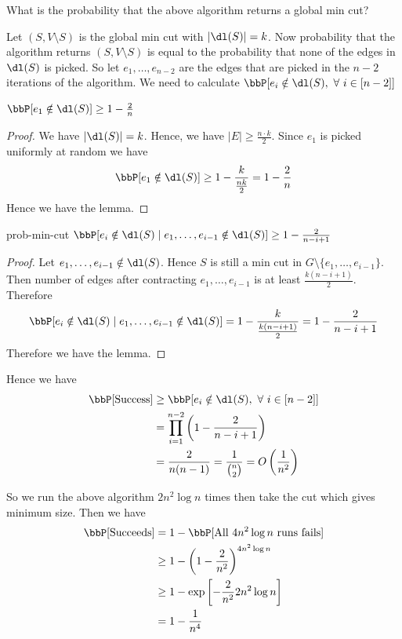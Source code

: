 \begin{question}{}{}
	What is the probability that the above algorithm returns a global min cut?
\end{question}
Let $(S,V\setminus S)$ is the global min cut with $|\dl(S)|=k$. Now probability that the algorithm returns $(S,V\setminus S)$ is equal to the probability that none of the edges in $\dl(S)$ is picked. So let $e_1,\dots, e_{n-2}$ are the edges that are picked in the $n-2$ iterations of the algorithm. We need to calculate $\bbP[e_i\notin \dl(S),\ \forall\ i\in[n-2]]$
\begin{lemma}{}{}
	$\bbP[e_1\notin \dl(S)]\geq 1-\frac2n$
\end{lemma}
\begin{proof}
	We have $|\dl(S)|=k$. Hence, we have $|E|\geq \frac{n\cdot k}2$. Since $e_1$ is picked uniformly at random we have $$\bbP[e_1\notin \dl(S)]\geq 1-\frac{k}{\frac{nk}{2} }=1-\frac2n$$Hence we have the lemma.
\end{proof}
\begin{lemma}{}{prob-min-cut}
	$\bbP[e_i\notin \dl(S)\mid e_1,\dots,e_{i-1}\notin \dl(S)]  \geq 1-\frac{2}{n-i+1}$
\end{lemma}
\begin{proof}
	Let $e_1,\dots, e_{i-1}\notin \dl(S)$. Hence $S$ is still a min cut in $G\setminus\{e_1,\dots, e_{i-1}\}$. Then number of edges after contracting $e_1,\dots, e_{i-1}$ is at least $\frac{k(n-i+1)}2$. Therefore $$\bbP[e_i\notin \dl(S)\mid e_1,\dots,e_{i-1}\notin \dl(S)]=1-\frac{k}{\frac{k(n-i+1)}2}=1-\frac2{n-i+1}$$Therefore we have the lemma.
\end{proof}

Hence we have \begin{align*}
	\bbP[\text{Success}] & \geq \bbP[e_i\notin \dl(S),\ \forall\ i\in[n-2]]              \\
	                     & =\prod\limits_{i=1}^{n-2}\lt(1-\frac{2}{n-i+1}\rt)            \\
	                     & = \frac2{n(n-1)}=\dfrac{1}{\binom{n}{2}}=O\lt(\frac1{n^2}\rt)
\end{align*}

So we run the above algorithm $2n^2\log n$ times then take the cut which gives minimum size. Then we have \begin{align*}
	\bbP[\text{Succeeds}] & =1-\bbP[\text{All $4n^2\log n$ runs fails}] \\
	                      & \geq 1- \lt(1-\frac2{n^2}\rt)^{4n^2\log n}  \\
	                      & \geq 1-\exp\lt[-\frac2{n^2}2n^2\log n\rt]   \\
	                      & = 1-\frac1{n^4}
\end{align*}

